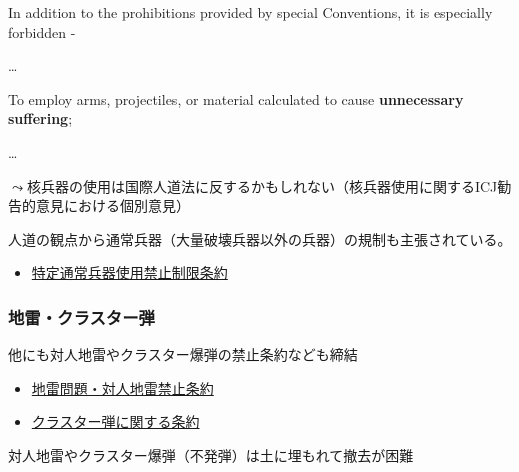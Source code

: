 \documentclass[
  xelatex,
  ja=standard]{bxjsarticle}
\providecommand{\tightlist}{%
  \setlength{\itemsep}{0pt}\setlength{\parskip}{0pt}}\usepackage{longtable,booktabs,array}
\begin{document}
\begin{tcolorbox}[enhanced jigsaw, left=2mm, toprule=.15mm, opacityback=0, colframe=quarto-callout-note-color-frame, opacitybacktitle=0.6, breakable, coltitle=black, colbacktitle=quarto-callout-note-color!10!white, colback=white, bottomtitle=1mm, toptitle=1mm, titlerule=0mm, title=\textcolor{quarto-callout-note-color}{\faInfo}\hspace{0.5em}{\href{https://avalon.law.yale.edu/20th_century/hague04.asp}{ハーグ陸戦条約}　第23条}, arc=.35mm, rightrule=.15mm, bottomrule=.15mm, leftrule=.75mm]

In addition to the prohibitions provided by special Conventions, it is
especially forbidden -

\ldots{}

To employ arms, projectiles, or material calculated to cause
\textbf{unnecessary suffering};

\ldots{}

\end{tcolorbox}

\(\leadsto\)核兵器の使用は国際人道法に反するかもしれない（核兵器使用に関するICJ勧告的意見における個別意見）

人道の観点から通常兵器（大量破壊兵器以外の兵器）の規制も主張されている。

\begin{itemize}
\tightlist
\item
  \href{https://www.mofa.go.jp/mofaj/gaiko/arms/ccw/ccw.html}{特定通常兵器使用禁止制限条約}
\end{itemize}

\hypertarget{ux5730ux96f7ux30afux30e9ux30b9ux30bfux30fcux5f3e}{%
\subsubsection{地雷・クラスター弾}\label{ux5730ux96f7ux30afux30e9ux30b9ux30bfux30fcux5f3e}}

他にも対人地雷やクラスター爆弾の禁止条約なども締結

\begin{itemize}
\tightlist
\item
  \href{https://www.mofa.go.jp/mofaj/gaiko/arms/mine/genjo.html}{地雷問題・対人地雷禁止条約}
\item
  \href{https://www.mofa.go.jp/mofaj/gaiko/arms/cluster/0812_gh.html}{クラスター弾に関する条約}
\end{itemize}

対人地雷やクラスター爆弾（不発弾）は土に埋もれて撤去が困難
\end{document}
